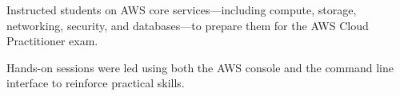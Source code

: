 \documentclass[letterpaper]{deedy-resume} %
\begin{document}
\begin{minipage}[t]{0.66\textwidth}
\sectionspace %



\vspace{\topsep} %
\begin{tightitemize}
\item Instructed students on AWS core services—including compute, storage, networking, security, and databases—to prepare them for the AWS Cloud Practitioner exam.
\item Hands-on sessions were led using both the AWS console and the command line interface to reinforce practical skills.
\end{tightitemize}

\sectionspace %








\end{minipage}
\end{document}
